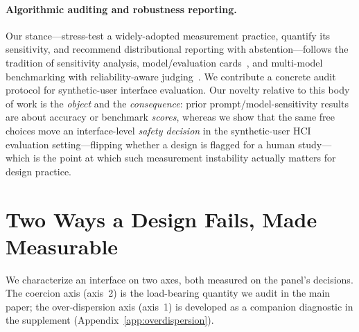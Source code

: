 \documentclass[manuscript,nonacm]{acmart}
\begin{document}
\paragraph{Algorithmic auditing and robustness reporting.} Our stance---stress-test a widely-adopted
measurement practice, quantify its sensitivity, and recommend distributional reporting with
abstention---follows the tradition of sensitivity analysis, model/evaluation cards~\cite{mitchell2019model},
and multi-model benchmarking with reliability-aware judging~\cite{zheng2023judging}. We contribute a
concrete audit protocol for synthetic-user interface evaluation. Our novelty relative to this body of work
is the \emph{object} and the \emph{consequence}: prior prompt/model-sensitivity results are about accuracy
or benchmark \emph{scores}, whereas we show that the same free choices move an interface-level \emph{safety
decision} in the synthetic-user HCI evaluation setting---flipping whether a design is flagged for a human
study---which is the point at which such measurement instability actually matters for design practice.

\section{Two Ways a Design Fails, Made Measurable}
\label{sec:definitions}

We characterize an interface on two axes, both measured on the panel's decisions. The coercion axis
(axis~2) is the load-bearing quantity we audit in the main paper; the over-dispersion axis (axis~1) is
developed as a companion diagnostic in the supplement (Appendix~\ref{app:overdispersion}).
\end{document}
